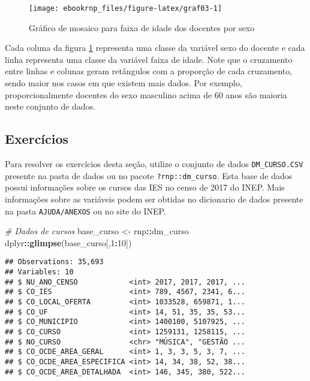 \documentclass[11pt,]{style/krantz}
\makeatletter
\newenvironment{Shaded}{\begin{snugshade}}{\end{snugshade}}
\newcommand{\CommentTok}[1]{\textcolor[rgb]{0.56,0.35,0.01}{\textit{#1}}}
\newcommand{\DecValTok}[1]{\textcolor[rgb]{0.00,0.00,0.81}{#1}}
\newcommand{\KeywordTok}[1]{\textcolor[rgb]{0.13,0.29,0.53}{\textbf{#1}}}
\newcommand{\NormalTok}[1]{#1}
\newcommand{\OperatorTok}[1]{\textcolor[rgb]{0.81,0.36,0.00}{\textbf{#1}}}
\newcommand{\StringTok}[1]{\textcolor[rgb]{0.31,0.60,0.02}{#1}}
\newenvironment{kframe}{%
\medskip{}
\setlength{\fboxsep}{.8em}
 \def\at@end@of@kframe{}%
 \ifinner\ifhmode%
  \def\at@end@of@kframe{\end{minipage}}%
  \begin{minipage}{\columnwidth}%
 \fi\fi%
 \def\FrameCommand##1{\hskip\@totalleftmargin \hskip-\fboxsep
 \colorbox{shadecolor}{##1}\hskip-\fboxsep
     \hskip-\linewidth \hskip-\@totalleftmargin \hskip\columnwidth}%
 \MakeFramed {\advance\hsize-\width
   \@totalleftmargin\z@ \linewidth\hsize
   \@setminipage}}%
 {\par\unskip\endMakeFramed%
 \at@end@of@kframe}
\renewenvironment{Shaded}{\begin{kframe}}{\end{kframe}}
\theoremstyle{definition}
\theoremstyle{definition}
\theoremstyle{definition}
\theoremstyle{remark}
\makeatother
\begin{document}
\begin{figure}[H]

{\centering \texttt{[image: ebookrnp\_files/figure-latex/graf03-1]}

}

\caption{Gráfico de mosaico para faixa de idade dos docentes por sexo}\label{fig:graf03}
\end{figure}

Cada coluna da figura \ref{fig:graf03} representa uma classe da variável sexo do docente e cada linha representa uma classe da variável faixa de idade. Note que o cruzamento entre linhas e colunas geram retângulos com a proporção de cada cruzamento, sendo maior nos casos em que existem mais dados. Por exemplo, proporcionalmente docentes do sexo masculino acima de 60 anos são maioria neste conjunto de dados.

\hypertarget{exercicios}{%
\subsection{Exercícios}\label{exercicios}}

Para resolver os exercícios desta seção, utilize o conjunto de dados \texttt{DM\_CURSO.CSV} presente na pasta de dados ou no pacote \texttt{?rnp::dm\_curso}. Esta base de dados possui informações sobre os cursos das IES no censo de 2017 do INEP. Mais informações sobre as variáveis podem ser obtidas no dicionario de dados presente na pasta \texttt{AJUDA/ANEXOS} ou no site do INEP.

\begin{Shaded}
\begin{Highlighting}[]
\CommentTok{# Dados de cursos}
\NormalTok{base_curso <-}\StringTok{ }\NormalTok{rnp}\OperatorTok{::}\NormalTok{dm_curso}
\NormalTok{dplyr}\OperatorTok{::}\KeywordTok{glimpse}\NormalTok{(base_curso[,}\DecValTok{1}\OperatorTok{:}\DecValTok{10}\NormalTok{])}
\end{Highlighting}
\end{Shaded}

\begin{verbatim}
## Observations: 35,693
## Variables: 10
## $ NU_ANO_CENSO            <int> 2017, 2017, 2017, ...
## $ CO_IES                  <int> 789, 4567, 2341, 6...
## $ CO_LOCAL_OFERTA         <int> 1033528, 659871, 1...
## $ CO_UF                   <int> 14, 51, 35, 35, 53...
## $ CO_MUNICIPIO            <int> 1400100, 5107925, ...
## $ CO_CURSO                <int> 1259131, 1258115, ...
## $ NO_CURSO                <chr> "MÚSICA", "GESTÃO ...
## $ CO_OCDE_AREA_GERAL      <int> 1, 3, 3, 5, 3, 7, ...
## $ CO_OCDE_AREA_ESPECIFICA <int> 14, 34, 38, 52, 38...
## $ CO_OCDE_AREA_DETALHADA  <int> 146, 345, 380, 522...
\end{verbatim}
\end{document}
